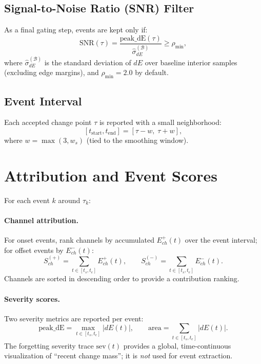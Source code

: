 \documentclass{article}
\begin{document}
\subsection{Signal-to-Noise Ratio (SNR) Filter}
As a final gating step, events are kept only if:
\[
\mathrm{SNR}(\tau) = \frac{\mathrm{peak\_dE}(\tau)}{\hat{\sigma}_{dE}^{(\mathcal{B})}} \ge \rho_{\min},
\]
where $\hat{\sigma}_{dE}^{(\mathcal{B})}$ is the standard deviation of $dE$ over baseline interior
samples (excluding edge margins), and $\rho_{\min} = 2.0$ by default.

\subsection{Event Interval}
Each accepted change point $\tau$ is reported with a small neighborhood:
\[
[t_{\text{start}}, t_{\text{end}}] = [\tau - w,\; \tau + w],
\]
where $w = \max(3, w_s)$ (tied to the smoothing window).

\section{Attribution and Event Scores}
For each event $k$ around $\tau_k$:

\paragraph{Channel attribution.}
For onset events, rank channels by accumulated $E^{+}_{ch}(t)$ over the event interval;
for offset events by $E^{-}_{ch}(t)$:
\[
S_{ch}^{(+)} = \sum_{t\in[t_s, t_e]} E^{+}_{ch}(t),\qquad
S_{ch}^{(-)} = \sum_{t\in[t_s, t_e]} E^{-}_{ch}(t).
\]
Channels are sorted in descending order to provide a contribution ranking.

\paragraph{Severity scores.}
Two severity metrics are reported per event:
\[
\mathrm{peak\_dE} = \max_{t\in[t_s, t_e]} |dE(t)|,\qquad
\mathrm{area} = \sum_{t\in[t_s, t_e]} |dE(t)|.
\]
The forgetting severity trace $\mathrm{sev}(t)$ provides a global, time-continuous visualization
of ``recent change mass''; it is \emph{not} used for event extraction.
\end{document}
